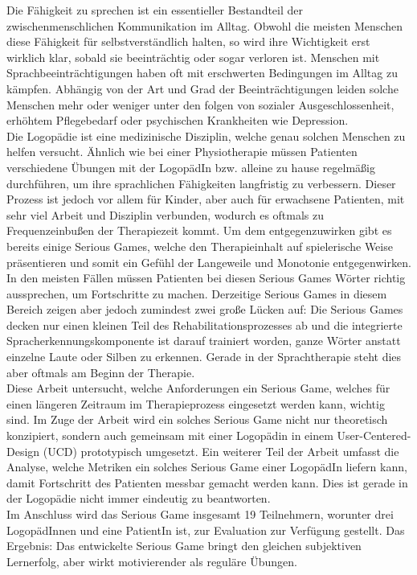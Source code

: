 \documentclass[draft,final]{vutinfth} %
\begin{document}
\begin{kurzfassung}
Die Fähigkeit zu sprechen ist ein essentieller Bestandteil der zwischenmenschlichen Kommunikation im Alltag. Obwohl die meisten Menschen diese Fähigkeit für selbstverständlich halten, so wird ihre Wichtigkeit erst wirklich klar, sobald sie beeinträchtig oder sogar verloren ist. Menschen mit Sprachbeeinträchtigungen haben oft mit erschwerten Bedingungen im Alltag zu kämpfen. Abhängig von der Art und Grad der Beeinträchtigungen leiden solche Menschen mehr oder weniger unter den folgen von sozialer Ausgeschlossenheit, erhöhtem Pflegebedarf oder psychischen Krankheiten wie Depression. \\
Die Logopädie ist eine medizinische Disziplin, welche genau solchen Menschen zu helfen versucht. Ähnlich wie bei einer Physiotherapie müssen Patienten verschiedene Übungen mit der LogopädIn bzw. alleine zu hause regelmäßig durchführen, um ihre sprachlichen Fähigkeiten langfristig zu verbessern. Dieser Prozess ist jedoch vor allem für Kinder, aber auch für erwachsene Patienten, mit sehr viel Arbeit und Disziplin verbunden, wodurch es oftmals zu Frequenzeinbußen der Therapiezeit kommt. Um dem entgegenzuwirken gibt es bereits einige Serious Games, welche den Therapieinhalt auf spielerische Weise präsentieren und somit ein Gefühl der Langeweile und Monotonie entgegenwirken. In den meisten Fällen müssen Patienten bei diesen Serious Games Wörter richtig aussprechen, um Fortschritte zu machen. Derzeitige Serious Games in diesem Bereich zeigen aber jedoch zumindest zwei große Lücken auf: Die Serious Games decken nur einen kleinen Teil des Rehabilitationsprozesses ab und die integrierte  Spracherkennungskomponente ist darauf trainiert worden, ganze Wörter anstatt einzelne Laute oder Silben zu erkennen. Gerade in der Sprachtherapie steht dies aber oftmals am Beginn der Therapie.\\
Diese Arbeit untersucht, welche Anforderungen ein Serious Game, welches für einen längeren Zeitraum im Therapieprozess eingesetzt werden kann, wichtig sind. Im Zuge der Arbeit wird ein solches Serious Game nicht nur theoretisch konzipiert, sondern auch gemeinsam mit einer Logopädin in einem User-Centered-Design (UCD) prototypisch umgesetzt. Ein weiterer Teil der Arbeit umfasst die Analyse, welche Metriken ein solches Serious Game einer LogopädIn liefern kann, damit Fortschritt des Patienten messbar gemacht werden kann. Dies ist gerade in der Logopädie nicht immer eindeutig zu beantworten. \\
Im Anschluss wird das Serious Game insgesamt 19 Teilnehmern, worunter drei LogopädInnen und eine PatientIn ist, zur Evaluation zur Verfügung gestellt. Das Ergebnis: Das entwickelte Serious Game bringt den gleichen subjektiven Lernerfolg, aber wirkt motivierender als reguläre Übungen. 
\end{kurzfassung}
\end{document}
